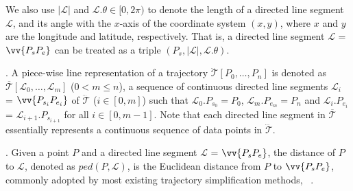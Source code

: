 We also use $|\mathcal{L}|$ and $\mathcal{L}.\theta\in [0, 2\pi)$ to denote the length of a directed line segment $\mathcal{L}$, and its angle with the $x$-axis of the coordinate system $(x, y)$, where $x$ and $y$ are the longitude and latitude, respectively.
That is, a directed line segment $\mathcal{L}$ = $\vv{P_{s}P_{e}}$ can be treated as a triple $(P_s, |\mathcal{L}|, \mathcal{L}.\theta)$.

. A piece-wise line representation of a trajectory $\dddot{\mathcal{T}}[P_0, \ldots, P_n]$ is denoted as $\overline{\mathcal{T}}[\mathcal{L}_0, \ldots , \mathcal{L}_m]$ ($0< m \le n$), a sequence of continuous directed line segments $\mathcal{L}_{i}$ = $\vv{P_{s_i}P_{e_i}}$ of $\dddot{\mathcal{T}}$ ($i\in[0,m]$)  such that $\mathcal{L}_{0}.P_{s_0} = P_0$, $\mathcal{L}_{m}.P_{e_m} = P_n$ and  $\mathcal{L}_{i}.P_{e_i}$ = $\mathcal{L}_{i+1}.P_{s_{i+1}}$ for all $i\in[0, m-1]$. Note that each directed line segment in $\overline{\mathcal{T}}$ essentially represents a continuous sequence of data points in $\dddot{\mathcal{T}}$.



. Given a point $P$ and a directed line segment $\mathcal{L}$ = $\vv{P_{s}P_{e}}$, the distance of $P$ to $\mathcal{L}$, denoted as $ped(P, \mathcal{L})$, is the Euclidean distance from $P$ to $\vv{P_sP_e}$, commonly adopted by most existing trajectory simplification methods, \eg~\cite{Douglas:Peucker, Hershberger:Speeding, Keogh:online, Chen:Fast, Liu:BQS, Williams:Longest, Sklansky:Cone, Dunham:Cone, Zhao:Sleeve, Lin:Operb}.


